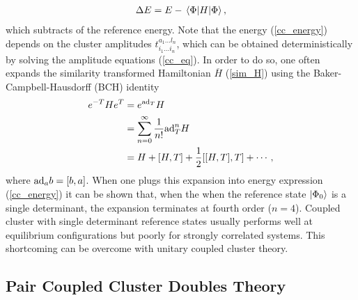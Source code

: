 \documentclass[Dual]{msu-thesis}
\begin{document}
\begin{align}
\label{cc_e_corr}
\Delta E = E-\mel{\Phi}{H}{\Phi},
\end{align}
which subtracts of the reference energy. Note that the energy (\ref{cc_energy}) depends on the cluster amplitudes $t_{i_1\ldots i_n}^{a_1\ldots l_n}$, which can be obtained deterministically by solving the amplitude equations (\ref{cc_eq}). In order to do so, one often expands the similarity transformed Hamiltonian $\overline{H}$ (\ref{sim_H}) using the Baker-Campbell-Hausdorff (BCH) identity
\begin{align}
e^{-T}He^T
&=
e^{\text{ad}_T}H
\nonumber
\\
&=
\sum_{n=0}^\infty\frac{1}{n!}\text{ad}^n_TH
\nonumber
\\
&=
\label{cc_bch_expansion}
H+\comm{H}{T}+\frac{1}{2}\comm{\comm{H}{T}}{T}+\cdots,
\end{align}
where $\text{ad}_ab=\comm{b}{a}$. When one plugs this expansion into energy expression (\ref{cc_energy}) it can be shown that, when the when the reference state $\ket{\Phi_0}$ is a single determinant, the expansion terminates at fourth order ($n=4$). Coupled cluster with single determinant reference states usually performs well at equilibrium configurations but poorly for strongly correlated systems. This shortcoming can be overcome with unitary coupled cluster theory.

\subsection{Pair Coupled Cluster Doubles Theory}
\end{document}
